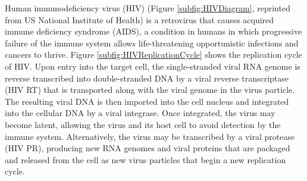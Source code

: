 Human immunodeficiency virus (HIV) (Figure \ref{subfig:HIVDiagram}, reprinted from US National Institute of Health) is a retrovirus that causes acquired immune deficiency syndrome (AIDS), a condition in humans in which progressive failure of the immune system allows life-threatening opportunistic infections and cancers to thrive. Figure \ref{subfig:HIVReplicationCycle} \citep{296-2010} shows the replication cycle of HIV. Upon entry into the target cell, the single-stranded viral RNA genome is reverse transcribed into double-stranded DNA by a viral reverse transcriptase (HIV RT) that is transported along with the viral genome in the virus particle. The resulting viral DNA is then imported into the cell nucleus and integrated into the cellular DNA by a viral integrase. Once integrated, the virus may become latent, allowing the virus and its host cell to avoid detection by the immune system. Alternatively, the virus may be transcribed by a viral protease (HIV PR), producing new RNA genomes and viral proteins that are packaged and released from the cell as new virus particles that begin a new replication cycle.

